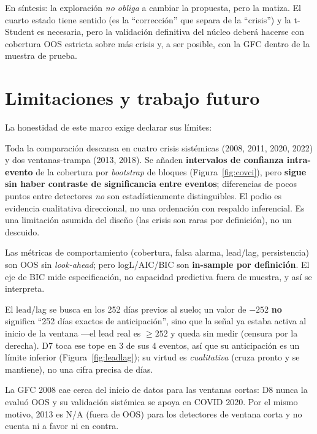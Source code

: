 \documentclass[11pt,a4paper]{article}
\begin{document}
\noindent En s\'intesis: la exploraci\'on \emph{no obliga} a cambiar la propuesta, pero la
matiza. El cuarto estado tiene sentido (es la ``correcci\'on'' que separa de la ``crisis'')
y la t-Student es necesaria, pero la validaci\'on definitiva del n\'ucleo deber\'a hacerse
con cobertura OOS estricta sobre m\'as crisis y, a ser posible, con la GFC dentro de la
muestra de prueba.

\section{Limitaciones y trabajo futuro}
\label{sec:limitaciones}

La honestidad de este marco exige declarar sus l\'imites:

\begin{description}[leftmargin=1.2em,style=nextline]
  \item[Significancia con $n\approx4$ crisis.] Toda la comparaci\'on descansa en cuatro
  crisis sist\'emicas (2008, 2011, 2020, 2022) y dos ventanas-trampa (2013, 2018). Se a\~naden
  \textbf{intervalos de confianza intra-evento} de la cobertura por \emph{bootstrap} de bloques
  (Figura~\ref{fig:covci}), pero \textbf{sigue sin haber contraste de significancia entre
  eventos}; diferencias de pocos puntos entre detectores \emph{no} son estad\'isticamente
  distinguibles. El podio es evidencia
  cualitativa direccional, no una ordenaci\'on con respaldo inferencial. Es una limitaci\'on
  asumida del dise\~no (las crisis son raras por definici\'on), no un descuido.
  \item[BIC in-sample.] Las m\'etricas de comportamiento (cobertura, falsa alarma, lead/lag,
  persistencia) son OOS sin \emph{look-ahead}; pero logL/AIC/BIC son \textbf{in-sample por
  definici\'on}. El eje de BIC mide especificaci\'on, no capacidad predictiva fuera de
  muestra, y as\'i se interpreta.
  \item[Lead/lag censurado.] El lead/lag se busca en los 252 d\'ias previos al suelo; un
  valor de $-252$ \textbf{no} significa ``252 d\'ias exactos de anticipaci\'on'', sino que
  la se\~nal ya estaba activa al inicio de la ventana ---el lead real es $\ge252$ y queda
  sin medir (censura por la derecha). D7 toca ese tope en 3 de sus 4 eventos, as\'i que su
  anticipaci\'on es un l\'imite inferior (Figura~\ref{fig:leadlag}); su virtud es \emph{cualitativa} (cruza pronto y se
  mantiene), no una cifra precisa de d\'ias.
  \item[Equidad de ventana.] La GFC 2008 cae cerca del inicio de datos para las ventanas
  cortas: D8 nunca la evalu\'o OOS y su validaci\'on sist\'emica se apoya en COVID 2020. Por
  el mismo motivo, 2013 es N/A (fuera de OOS) para los detectores de ventana corta y no
  cuenta ni a favor ni en contra.
\end{description}
\end{document}
